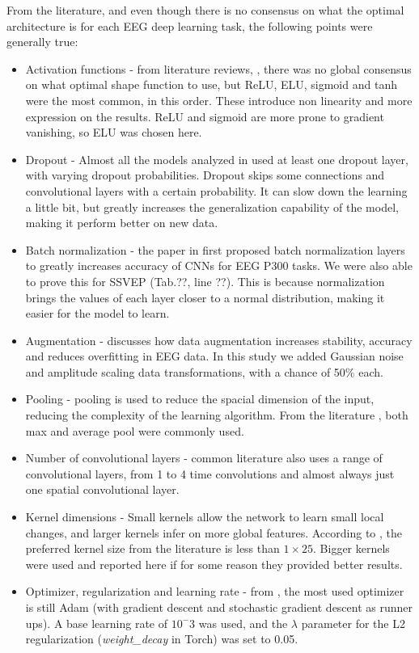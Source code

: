 From the literature, and even though there is no consensus on what the optimal architecture is for each EEG deep learning task, the following points were generally true:
\begin{itemize}
    \item Activation functions - from literature reviews, \cite{xu2023analysis, rakhmatulin2024exploring}, there was no global consensus on what optimal shape function to use, but ReLU, ELU, sigmoid and tanh were the most common, in this order. These introduce non linearity and more expression on the results. ReLU and sigmoid are more prone to gradient vanishing, so ELU was chosen here. %
    \item Dropout - Almost all the models analyzed in \cite{xu2023analysis} used at least one dropout layer, with varying dropout probabilities. Dropout skips some connections and convolutional layers with a certain probability. It can slow down the learning a little bit, but greatly increases the generalization capability of the model, making it perform better on new data.
    \item Batch normalization - the paper in \cite{liu2018deep} first proposed batch normalization layers to greatly increases accuracy of CNNs for EEG P300 tasks. We were also able to prove this for SSVEP (Tab.??, line ??). This is because normalization brings the values of each layer closer to a normal distribution, making it easier for the model to learn.
    \item Augmentation - \cite{lashgari2020data_augment} discusses how data augmentation increases stability, accuracy and reduces overfitting in EEG data. In this study we added Gaussian noise and amplitude scaling data transformations, with a chance of 50\% each.
    \item Pooling - pooling is used to reduce the spacial dimension of the input, reducing the complexity of the learning algorithm. From the literature \cite{xu2023analysis}, both max and average pool were commonly used.
    \item Number of convolutional layers - common literature also uses a range of convolutional layers, from 1 to 4 time convolutions and almost always just one spatial convolutional layer.
    \item Kernel dimensions - Small kernels allow the network to learn small local changes, and larger kernels infer on more global features. According to \cite{xu2023analysis}, the preferred kernel size from the literature is less than $1 \times 25$. Bigger kernels were used and reported here if for some reason they provided better results.
    \item Optimizer, regularization and learning rate - from \cite{xu2023analysis}, the most used optimizer is still Adam (with gradient descent and stochastic gradient descent as runner ups). A base learning rate of $10^-3$ was used, and the $\lambda$ parameter for the L2 regularization (\textit{weight\_decay} in Torch) was set to 0.05.
\end{itemize}


